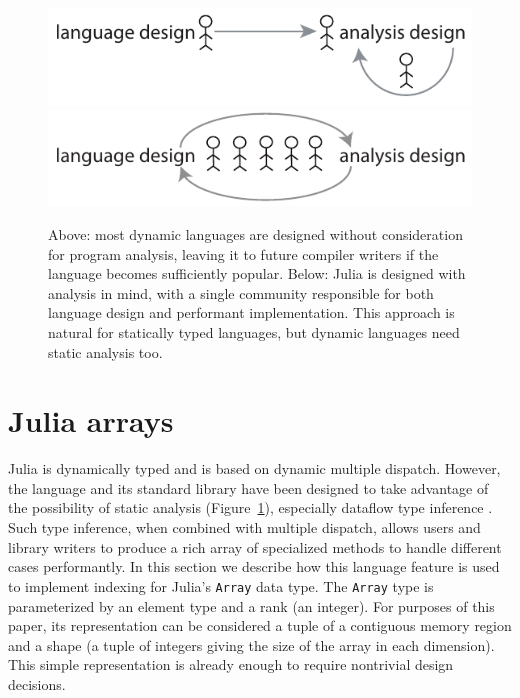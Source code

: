 \documentclass{sigplanconf}
\newcommand{\code}[1]{\texttt{#1}}
\begin{document}


\begin{figure}
  \centering
  \includegraphics[width=\columnwidth]{fig-design-old}
  \includegraphics[width=\columnwidth]{fig-design-new}
  \caption{\label{fig:langdesign}
Above: most dynamic languages are designed without consideration for program
analysis, leaving it to future compiler writers if the language becomes
sufficiently popular.
Below: Julia is designed with analysis in mind, with a single community responsible
for both language design and performant implementation. This approach is
natural for statically typed languages, but dynamic languages need static analysis too.}
\end{figure}

\section{Julia arrays}

Julia\cite{Bezanson:2012jf} is dynamically typed and is based on dynamic
multiple dispatch. However, the language and its standard library have been
designed to take advantage of the possibility of static analysis
(Figure~\ref{fig:langdesign}), especially dataflow type inference \cite{Cousot:1977, kaplanullman}. Such type
inference, when combined with multiple dispatch, allows users and library
writers to produce a rich array of specialized methods to handle different
cases performantly. In this section we describe how this language feature
is used to implement indexing for Julia's \code{Array} data type.
The \code{Array} type is parameterized by an element type and a rank (an
integer). For purposes of this paper, its representation can be considered a
tuple of a contiguous memory region and a shape (a tuple of integers giving
the size of the array in each dimension). This simple representation is
already enough to require nontrivial design decisions.
\end{document}
